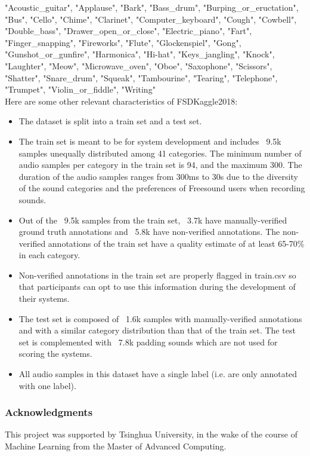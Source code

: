 \documentclass{article} %
\begin{document}
		"Acoustic\_guitar", "Applause", "Bark", "Bass\_drum", "Burping\_or\_eructation", "Bus", "Cello", "Chime", "Clarinet", "Computer\_keyboard", "Cough", "Cowbell", "Double\_bass", "Drawer\_open\_or\_close", "Electric\_piano", "Fart", "Finger\_snapping", "Fireworks", "Flute", "Glockenspiel", "Gong", "Gunshot\_or\_gunfire", "Harmonica", "Hi-hat", "Keys\_jangling", "Knock", "Laughter", "Meow", "Microwave\_oven", "Oboe", "Saxophone", "Scissors", "Shatter", "Snare\_drum", "Squeak", "Tambourine", "Tearing", "Telephone", "Trumpet", "Violin\_or\_fiddle", "Writing"\\
		\newline
		Here are some other relevant characteristics of FSDKaggle2018:
		\begin{itemize}
		    \item The dataset is split into a train set and a test set.
		    \item The train set is meant to be for system development and includes ~9.5k samples unequally distributed among 41 categories. The minimum number of audio samples per category in the train set is 94, and the maximum 300. The duration of the audio samples ranges from 300ms to 30s due to the diversity of the sound categories and the preferences of Freesound users when recording sounds.
		    \item Out of the ~9.5k samples from the train set, ~3.7k have manually-verified ground truth annotations and ~5.8k have non-verified annotations. The non-verified annotations of the train set have a quality estimate of at least 65-70\% in each category.
		    \item Non-verified annotations in the train set are properly flagged in train.csv so that participants can opt to use this information during the development of their systems.
		    \item The test set is composed of ~1.6k samples with manually-verified annotations and with a similar category distribution than that of the train set. The test set is complemented with ~7.8k padding sounds which are not used for scoring the systems.
		    \item All audio samples in this dataset have a single label (i.e. are only annotated with one label).
		\end{itemize}

\subsubsection*{Acknowledgments}

	This project was supported by Tsinghua University, in the wake of the course of Machine Learning from the Master of Advanced Computing.

\nocite{*}


\end{document}
